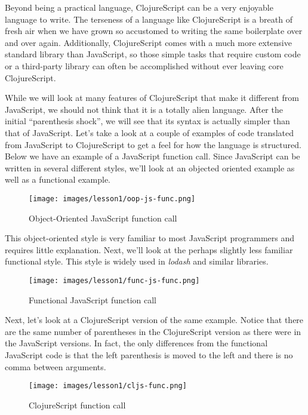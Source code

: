 \documentclass[10pt,twoside,openright]{memoir}
\begin{document}
Beyond being a practical language, ClojureScript can be a very enjoyable
language to write. The terseness of a language like ClojureScript is a
breath of fresh air when we have grown so accustomed to writing the same
boilerplate over and over again. Additionally, ClojureScript comes with
a much more extensive standard library  than JavaScript, so those simple
tasks that require custom code or a third-party library can often be
accomplished without ever leaving core ClojureScript.

While we will look at many features of ClojureScript that make it
different from JavaScript, we should not think that it is a totally
alien language. After the initial ``parenthesis shock'', we will see
that its syntax is actually simpler than that of JavaScript. Let's take
a look at a couple of examples of code translated from JavaScript to
ClojureScript to get a feel for how the language is structured. Below we
have an example of a JavaScript function call. Since JavaScript can be
written in several different styles, we'll look at an objected oriented
example as well as a functional example.

\begin{figure}[H]
\caption{Object-Oriented JavaScript function call}
\centering
\texttt{[image: images/lesson1/oop-js-func.png]}
\end{figure}

This object-oriented style  is very familiar to most JavaScript
programmers and requires little explanation. Next, we'll look at the
perhaps slightly less familiar functional style. This style is widely
used in \emph{lodash} and similar libraries.

\begin{figure}[H]
\caption{Functional JavaScript function call}
\centering
\texttt{[image: images/lesson1/func-js-func.png]}
\end{figure}

Next, let's look at a ClojureScript version of the same example. Notice
that there are the same number of parentheses in the ClojureScript
version as there were in the JavaScript versions. In fact, the only
differences from the functional JavaScript code is that the left
parenthesis is moved to the left and there is no comma between
arguments.

\begin{figure}[H]
\caption{ClojureScript function call}
\centering
\texttt{[image: images/lesson1/cljs-func.png]}
\end{figure}
\end{document}
